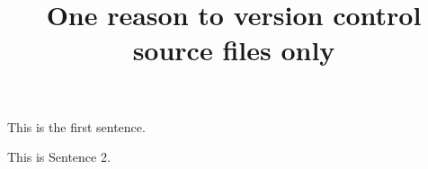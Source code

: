\documentclass{article}
\title{One reason to version control source files only}
\begin{document}
\maketitle

This is the first sentence.

This is Sentence 2.
\end{document}
